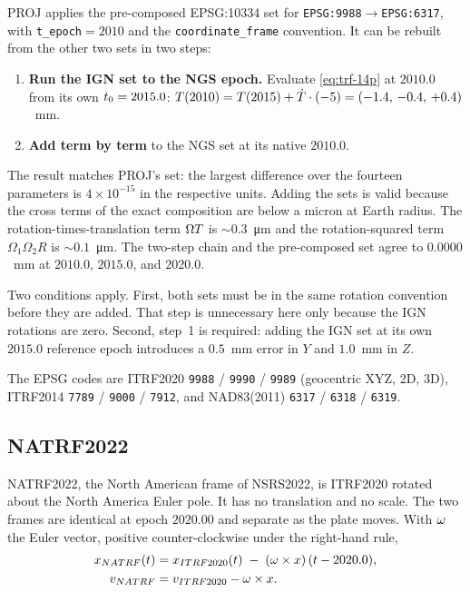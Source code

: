 \documentclass[main.tex]{subfiles}
\begin{document}
PROJ applies the pre-composed EPSG:10334 set for
\texttt{EPSG:9988}$\to$\texttt{EPSG:6317}, with
\texttt{t\_epoch}$=2010$ and the \texttt{coordinate\_frame} convention.
It can be rebuilt from the other two sets in two steps:

\begin{enumerate}[leftmargin=*]
\item \textbf{Run the IGN set to the NGS epoch.}  Evaluate
      \eqref{eq:trf-14p} at $2010.0$ from its own $t_0=2015.0$:
      $T(2010) = T(2015) + \dot{T}\cdot(-5)
       = (-1.4,\,-0.4,\,+0.4)$~mm.
\item \textbf{Add term by term} to the NGS set at its native $2010.0$.
\end{enumerate}

The result matches PROJ's set: the largest difference over the fourteen
parameters is $4\times10^{-15}$ in the respective units.  Adding the
sets is valid because the cross terms of the exact composition are
below a micron at Earth radius.  The rotation-times-translation term
$\Omega T$ is $\sim\!0.3$~\si{\micro\metre} and the
rotation-squared term $\Omega_1\Omega_2 R$ is
$\sim\!0.1$~\si{\micro\metre}.  The two-step chain and the pre-composed
set agree to $0.0000$~mm at $2010.0$, $2015.0$, and $2020.0$.

Two conditions apply.  First, both sets must be in the same rotation
convention before they are added.  That step is unnecessary here only
because the IGN rotations are zero.  Second, step~1 is required: adding
the IGN set at its own $2015.0$ reference epoch introduces a $0.5$~mm
error in $Y$ and $1.0$~mm in $Z$.

The EPSG codes are ITRF2020 \texttt{9988} /
\texttt{9990} / \texttt{9989} (geocentric XYZ, 2D, 3D), ITRF2014
\texttt{7789} / \texttt{9000} / \texttt{7912}, and NAD83(2011)
\texttt{6317} / \texttt{6318} / \texttt{6319}.

\subsection{NATRF2022}\label{sec:trf-natrf}

NATRF2022, the North American frame of NSRS2022, is ITRF2020 rotated
about the North America Euler pole.  It has no translation and no
scale.  The two frames are identical at epoch $2020.00$ and separate as
the plate moves.  With $\omega$ the Euler vector, positive
counter-clockwise under the right-hand rule,
\begin{align}
x_{NATRF}(t)
  &= x_{ITRF2020}(t)
     \;-\; (\omega \times x)\,(t - 2020.0),
     \label{eq:trf-natrf-pos}\\
v_{NATRF} &= v_{ITRF2020} - \omega \times x.
     \label{eq:trf-natrf-vel}
\end{align}
\end{document}
